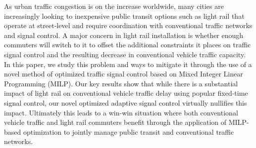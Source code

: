 As urban traffic congestion is on the increase worldwide, many cities are
increasingly looking to inexpensive public transit options such as light rail
that operate at street-level and require coordination with conventional traffic
networks and signal control. A major concern in light rail installation is
whether enough commuters will switch to it to offset the additional constraints
it places on traffic signal control and the resulting decrease in conventional
vehicle traffic capacity. In this paper, we study this problem and ways to
mitigate it through the use of a novel method of optimized traffic signal
control based on Mixed Integer Linear Programming (MILP). Our key results show
that while there is a substantial impact of light rail on conventional vehicle
traffic delay using popular fixed-time signal control, our novel optimized
adaptive signal control virtually nullifies this impact. Ultimately this leads to a
win-win situation where both conventional vehicle traffic and light rail
commuters benefit through the application of MILP-based optimization to jointly
manage public transit and conventional traffic networks.
